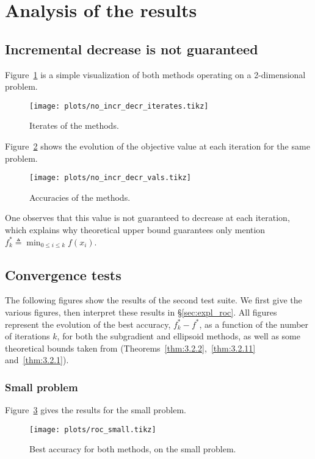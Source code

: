 \documentclass[final]{aomart}
\newcommand{\fopt}{f^*}
\newcommand{\foptk}{f^*_k}
\newtheorem[{}\it]{thm}{Theorem}[section]
\theoremstyle{definition}
\newtheorem*[{}\it]{notation}{Notation}
\numberwithin{equation}{section}
\newcommand{\secref}[1]{\S\ref{#1}}
\begin{document}
\section{Analysis of the results}
\label{sec:analysis}

\subsection{Incremental decrease is not guaranteed}
\label{sec:incr_decrease}
Figure~\ref{fig:no_incr_decr_iterates} is a simple visualization of both methods operating on a 2-dimensional problem.

\begin{figure}[H]
	\centering
	\texttt{[image: plots/no\_incr\_decr\_iterates.tikz]}
	\caption{Iterates of the methods.}
	\label{fig:no_incr_decr_iterates}
\end{figure}


Figure~\ref{fig:no_incr_decr_vals} shows the evolution of the objective value at each iteration for the same problem.
\begin{figure}[H]
	\centering
	\texttt{[image: plots/no\_incr\_decr\_vals.tikz]}
	\caption{Accuracies of the methods.}
\label{fig:no_incr_decr_vals}
\end{figure}

One observes that this value is not guaranteed to decrease at each iteration, which explains why theoretical upper bound guarantees only mention \(f^*_k \triangleq \min_{0 \leqslant i \leqslant k} f(x_i)\).

\subsection{Convergence tests}
\label{sec:convergence}
The following figures show the results of the second test suite.
We first give the various figures, then interpret these results in \secref{sec:expl_roc}.
All figures represent the evolution of the best accuracy, \(\foptk - \fopt\), as a function of the number of iterations \(k\), for both the subgradient and ellipsoid methods, as well as some theoretical bounds taken from \cite{Nesterov2018} (Theorems~\ref{thm:3.2.2},~\ref{thm:3.2.11} and~\ref{thm:3.2.1}).


\subsubsection{Small problem}
Figure~\ref{fig:roc_small} gives the results for the small problem.
\begin{figure}[H]
	\centering
	\texttt{[image: plots/roc\_small.tikz]}
	\caption{Best accuracy for both methods, on the small problem.}
	\label{fig:roc_small}
\end{figure}
\end{document}
